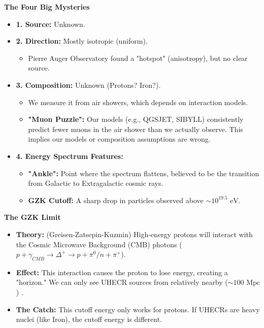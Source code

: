 \documentclass{sciposter}
\begin{document}
\begin{multicols}{3}
\textbf{The Four Big Mysteries}
    \begin{itemize}
        \item \textbf{1. Source:} Unknown.
        \item \textbf{2. Direction:} Mostly isotropic (uniform).
            \begin{itemize}
                \item Pierre Auger Observatory found a "hotspot" (anisotropy), but no clear source.
            \end{itemize}
        \item \textbf{3. Composition:} Unknown (Protons? Iron?).
            \begin{itemize}
                \item We measure it from air showers, which depends on interaction models.
                \item \textbf{"Muon Puzzle":} Our models (e.g., QGSJET, SIBYLL) consistently predict fewer muons in the air shower than we actually observe. This implies our models or composition assumptions are wrong.
            \end{itemize}
        \item \textbf{4. Energy Spectrum Features:}
            \begin{itemize}
                \item \textbf{"Ankle":} Point where the spectrum flattens, believed to be the transition from Galactic to Extragalactic cosmic rays.
                \item \textbf{GZK Cutoff:} A sharp drop in particles observed above $\sim 10^{19.5} \text{ eV}$.
            \end{itemize}
    \end{itemize}

 \textbf{The GZK Limit}
    \begin{itemize}
        \item \textbf{Theory:} (Greisen-Zatsepin-Kuzmin) High-energy protons will interact with the Cosmic Microwave Background (CMB) photons ($p + \gamma_{CMB}\rightarrow \Delta^{+}\rightarrow p+\pi^{0} / n+ \pi^{+}   $).
        \item \textbf{Effect:} This interaction causes the proton to lose energy, creating a "horizon." We can only see UHECR sources from relatively nearby ($\sim 100 \text{ Mpc}$) .
        \item \textbf{The Catch:} This cutoff energy only works for protons. If UHECRs are heavy nuclei (like Iron), the cutoff energy is different.
    \end{itemize}


\end{multicols}
\end{document}
